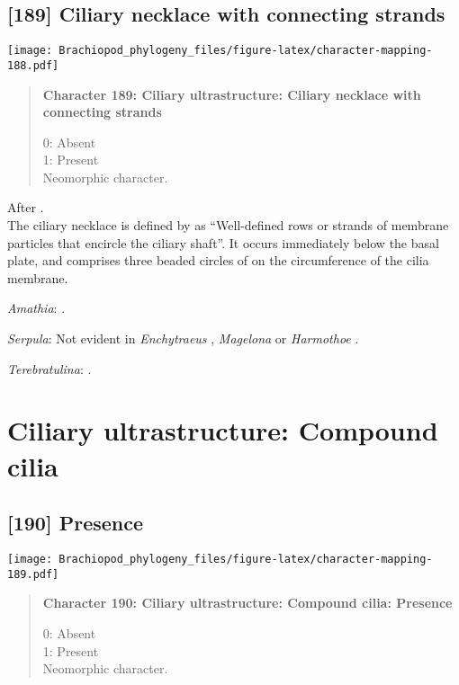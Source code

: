 \documentclass[openany]{book}
\theoremstyle{definition}
\theoremstyle{definition}
\theoremstyle{definition}
\theoremstyle{remark}
\begin{document}
\subsection*{{[}189{]} Ciliary necklace with connecting
strands}\label{ciliary-necklace-with-connecting-strands}

\texttt{[image: Brachiopod\_phylogeny\_files/figure-latex/character-mapping-188.pdf]}

\begin{quote}
\textbf{Character 189: Ciliary ultrastructure: Ciliary necklace with
connecting strands}

0: Absent\\
1: Present\\
Neomorphic character.
\end{quote}

After \citet{Lundin2009}.\\
The ciliary necklace is defined by \citet{Gilula1972} as ``Well-defined
rows or strands of membrane particles that encircle the ciliary shaft''.
It occurs immediately below the basal plate, and comprises three beaded
circles of on the circumference of the cilia membrane.

\hypertarget{Amathia-coding-189}{}
\emph{Amathia}: \citet{Reed1982}.

\hypertarget{Serpula-coding-189}{}
\emph{Serpula}: Not evident in \emph{Enchytraeus} \citep{Reger1967},
\emph{Magelona} \citep{Bartolomaeus1995} or \emph{Harmothoe}
\citep{Holborow1969}.

\hypertarget{Terebratulina-coding-189}{}
\emph{Terebratulina}: \citep{Luter1995}.

\section{Ciliary ultrastructure: Compound
cilia}\label{ciliary-ultrastructure-compound-cilia}

\subsection*{{[}190{]} Presence}\label{presence-4}

\texttt{[image: Brachiopod\_phylogeny\_files/figure-latex/character-mapping-189.pdf]}

\begin{quote}
\textbf{Character 190: Ciliary ultrastructure: Compound cilia: Presence}

0: Absent\\
1: Present\\
Neomorphic character.
\end{quote}
\end{document}
